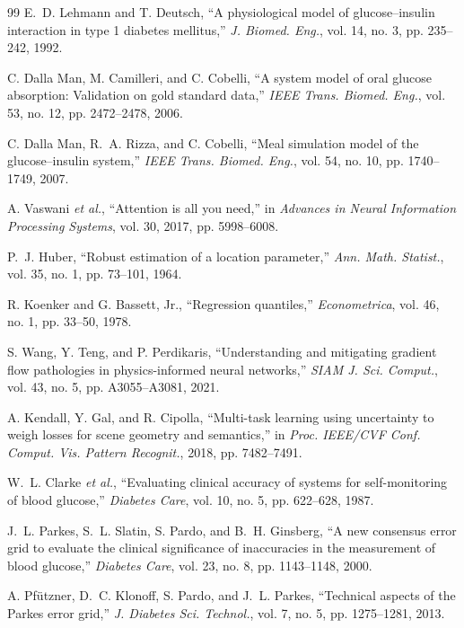 \documentclass[journal]{IEEEtran}
\begin{document}
\begin{thebibliography}{99}
\label{ref35label}E.~D. Lehmann and T. Deutsch, ``A physiological model of glucose--insulin interaction in type 1 diabetes mellitus,'' \emph{J. Biomed. Eng.}, vol. 14, no. 3, pp. 235--242, 1992.

\label{ref36label} C. Dalla Man, M. Camilleri, and C. Cobelli, ``A system model of oral glucose absorption: Validation on gold standard data,'' \emph{IEEE Trans. Biomed. Eng.}, vol. 53, no. 12, pp. 2472--2478, 2006.

\label{ref37label} C. Dalla Man, R.~A. Rizza, and C. Cobelli, ``Meal simulation model of the glucose--insulin system,'' \emph{IEEE Trans. Biomed. Eng.}, vol. 54, no. 10, pp. 1740--1749, 2007.

\label{ref38label} A. Vaswani \emph{et al.}, ``Attention is all you need,'' in \emph{Advances in Neural Information Processing Systems}, vol. 30, 2017, pp. 5998--6008.

\label{ref39label} P.~J. Huber, ``Robust estimation of a location parameter,'' \emph{Ann. Math. Statist.}, vol. 35, no. 1, pp. 73--101, 1964.

\label{ref40label} R. Koenker and G. Bassett, Jr., ``Regression quantiles,'' \emph{Econometrica}, vol. 46, no. 1, pp. 33--50, 1978.

\label{ref41label} S. Wang, Y. Teng, and P. Perdikaris, ``Understanding and mitigating gradient flow pathologies in physics-informed neural networks,'' \emph{SIAM J. Sci. Comput.}, vol. 43, no. 5, pp. A3055--A3081, 2021.

\label{ref42label} A. Kendall, Y. Gal, and R. Cipolla, ``Multi-task learning using uncertainty to weigh losses for scene geometry and semantics,'' in \emph{Proc. IEEE/CVF Conf. Comput. Vis. Pattern Recognit.}, 2018, pp. 7482--7491.

\label{ref43label} W.~L. Clarke \emph{et al.}, ``Evaluating clinical accuracy of systems for self-monitoring of blood glucose,'' \emph{Diabetes Care}, vol. 10, no. 5, pp. 622--628, 1987.

\label{ref44label} J.~L. Parkes, S.~L. Slatin, S. Pardo, and B.~H. Ginsberg, ``A new consensus error grid to evaluate the clinical significance of inaccuracies in the measurement of blood glucose,'' \emph{Diabetes Care}, vol. 23, no. 8, pp. 1143--1148, 2000.

\label{ref45label} A. Pf\"utzner, D.~C. Klonoff, S. Pardo, and J.~L. Parkes, ``Technical aspects of the Parkes error grid,'' \emph{J. Diabetes Sci. Technol.}, vol. 7, no. 5, pp. 1275--1281, 2013.


\end{thebibliography}
\end{document}
